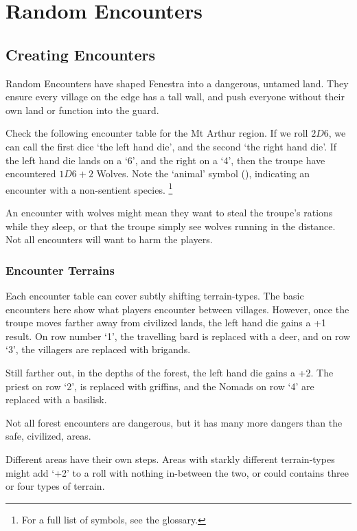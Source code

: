 \section{Random Encounters}
\label{encounters}

\begin{multicols}{2}

\subsection{Creating Encounters}

Random Encounters have shaped Fenestra into a dangerous, untamed land.
They ensure every village on the \gls{edge} has a tall wall, and push everyone without their own land or function into the \gls{guard}.

Check the following encounter table for the Mt Arthur region.
If we roll $2D6$, we can call the first dice `the left hand die', and the second `the right hand die'.
If the left hand die lands on a `6', and the right on a `4', then the troupe have encountered $1D6+2$ Wolves.
Note the `animal' symbol (\A), indicating an encounter with a non-sentient species.
\footnote{For a full list of symbols, see the glossary.}

An encounter with wolves might mean they want to steal the troupe's rations while they sleep, or that the troupe simply see wolves running in the distance.
Not all encounters will want to harm the players.

\subsubsection{Encounter Terrains}

Each encounter table can cover subtly shifting terrain-types.
The basic encounters here show what players encounter between villages.
However, once the troupe moves farther away from civilized lands, the left hand die gains a +1 result.
On row number `1', the travelling bard is replaced with a deer, and on row `3', the villagers are replaced with brigands.

Still farther out, in the depths of the forest, the left hand die gains a +2.
The priest on row `2', is replaced with griffins, and the Nomads on row `4' are replaced with a basilisk.

Not all forest encounters are dangerous, but it has many more dangers than the safe, civilized, areas.

Different areas have their own steps.
Areas with starkly different terrain-types might add `+2' to a roll with nothing in-between the two, or could contains three or four types of terrain.


\end{multicols}
